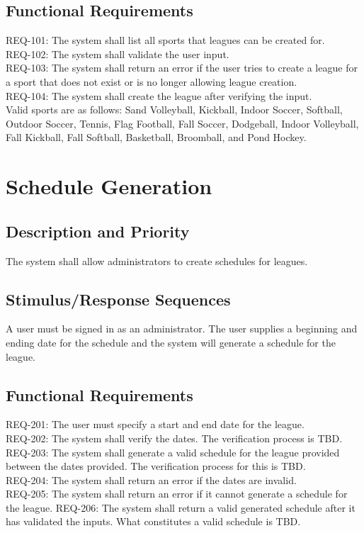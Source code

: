 \documentclass{scrreprt}
\begin{document}
\subsection{Functional Requirements}
REQ-101: The system shall list all sports that leagues can be created for. \\
REQ-102: The system shall validate the user input. \\
REQ-103: The system shall return an error if the user tries to create a league for a sport that does not exist or is no longer allowing league creation. \\
REQ-104: The system shall create the league after verifying the input. \\
\indent Valid sports are as follows: Sand Volleyball, Kickball, Indoor Soccer, Softball, Outdoor Soccer, Tennis, Flag Football, Fall Soccer, Dodgeball, Indoor Volleyball, Fall Kickball, Fall Softball, Basketball, Broomball, and Pond Hockey.


\section{Schedule Generation}

\subsection{Description and Priority}
The system shall allow administrators to create schedules for leagues.

\subsection{Stimulus/Response Sequences}
A user must be signed in as an administrator. The user supplies a beginning and ending date for the schedule and the system will generate a schedule for the league.

\subsection{Functional Requirements}

REQ-201: The user must specify a start and end date for the league. \\
REQ-202: The system shall verify the dates. The verification process is TBD.
REQ-203: The system shall generate a valid schedule for the league provided between the dates provided. The verification process for this is TBD.\\
REQ-204: The system shall return an error if the dates are invalid. \\
REQ-205: The system shall return an error if it cannot generate a schedule for the league.
REQ-206: The system shall return a valid generated schedule after it has validated the inputs. What constitutes a valid schedule is TBD. \\
\end{document}
